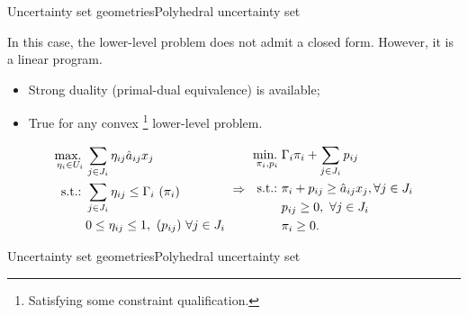 \begin{frame}{Uncertainty set geometries}{Polyhedral uncertainty set \cite{bertsimas2004price}}

	In this case, the lower-level problem does not admit a closed form.  However, it is a \alert{linear program}. 
	\vspace{-6pt}
	\begin{itemize}
		\item Strong duality (primal-dual equivalence) is available;
		\item True for any \alert{convex}%
		\footnote{Satisfying some constraint qualification.}
		 lower-level problem.	
	\end{itemize}
	\pause
	\begin{equation*}
		\begin{split}
			\mathop{\text{max.} \ }_{\eta_i \in U_i} & \sum_{j \in J_i} \eta_{ij} \hat{a}_{ij}x_j \\
			 \mathop{\text{s.t.:} \ } & \sum_{j \in J_i} \eta_{ij} \le \Gamma_i \ (\pi_i) \\
			 & 0 \le \eta_{ij} \le 1, \ (p_{ij}) \ \forall j \in J_i
		\end{split}
		\ \Rightarrow \
		\begin{split}
			\mathop{\text{min.} \ }_{\pi_i, p_i} & \Gamma_i\pi_i + \sum_{j \in J_i} p_{ij} \\
			 \mathop{\text{s.t.:} \ } & \pi_i + p_{ij} \ge \hat{a}_{ij}x_j, \forall j \in J_i \\
			 &p_{ij} \ge 0, \ \forall j \in J_i \\
			 &\pi_i \ge 0.
		\end{split}
	\end{equation*}
	
\end{frame}


\begin{frame}{Uncertainty set geometries}{Polyhedral uncertainty set \cite{bertsimas2004price}}

	\centering

\end{frame}



